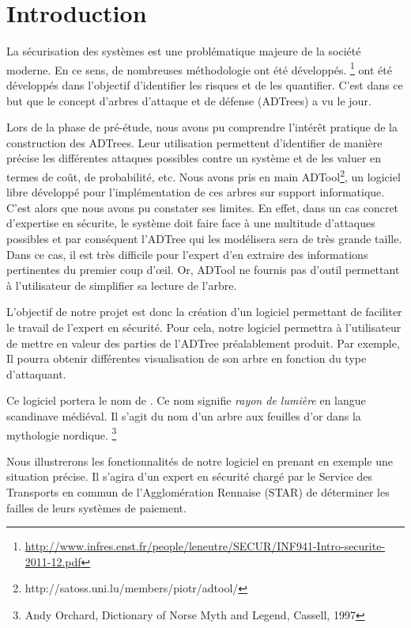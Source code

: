 \section{Introduction}
	
	La sécurisation des systèmes est une problématique majeure de la société moderne. En ce sens, de nombreuses méthodologie ont été développés. \footnote{\url{http://www.infres.enst.fr/people/leneutre/SECUR/INF941-Intro-securite-2011-12.pdf}}
	ont été développés dans l'objectif d'identifier les risques et de les quantifier. C'est dans ce but que le concept d'arbres d'attaque et de défense (ADTrees) a vu le jour.
	
	Lors de la phase de pré-étude, nous avons pu comprendre l’intérêt pratique de la construction des ADTrees. Leur utilisation permettent d'identifier de manière précise les différentes attaques possibles contre un système et de les valuer en termes de coût, de probabilité, etc. Nous avons pris en main ADTool\footnote{http://satoss.uni.lu/members/piotr/adtool/}, un logiciel libre développé pour l'implémentation de ces arbres sur support informatique. C'est alors que nous avons pu constater ses limites. En effet, dans un cas concret d'expertise en sécurite, le système doit faire face à une multitude d'attaques possibles et par conséquent l'ADTree qui les modélisera sera de très grande taille. Dans ce cas, il est très difficile pour l'expert d'en extraire des informations pertinentes du premier coup d’œil. Or, ADTool ne fournis pas d'outil permettant à l'utilisateur de simplifier sa lecture de l'arbre. 

	L'objectif de notre projet est donc la création d'un logiciel permettant de faciliter le travail de l'expert en sécurité. Pour cela, notre logiciel permettra à l'utilisateur de mettre en valeur des parties de l'ADTree préalablement produit. Par exemple, Il pourra obtenir différentes visualisation de son arbre en fonction du type d'attaquant. %

	 Ce logiciel portera le nom de \glasir. Ce nom signifie \textit{rayon de lumière} en langue scandinave médiéval. Il s'agit du nom d'un arbre aux feuilles d'or dans la mythologie nordique. \footnote{Andy Orchard, Dictionary of Norse Myth and Legend, Cassell, 1997}

	Nous illustrerons les fonctionnalités de notre logiciel en prenant en exemple une situation précise. Il s'agira d'un expert en sécurité chargé par le Service des Transports en commun de l'Agglomération Rennaise (STAR) de déterminer les failles de leurs systèmes de paiement. 













